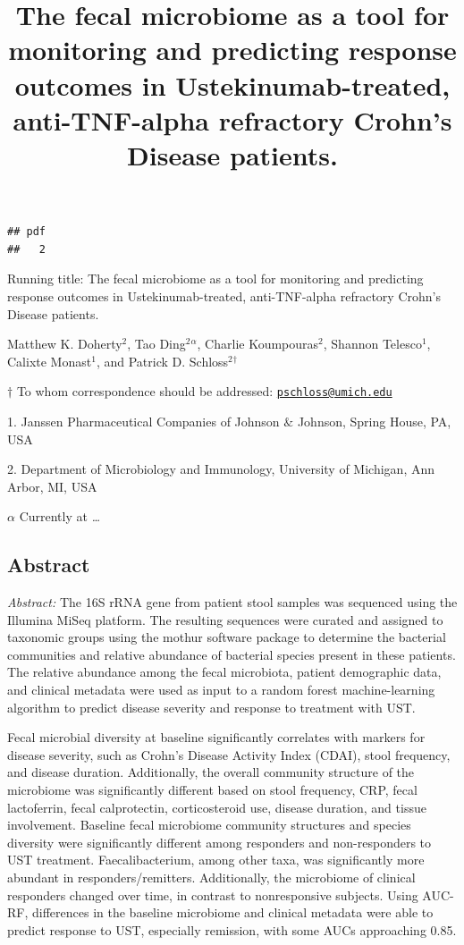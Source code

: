 \documentclass[11pt,]{article}
\title{The fecal microbiome as a tool for monitoring and predicting response
outcomes in Ustekinumab-treated, anti-TNF-alpha refractory Crohn's
Disease patients.}
\author{}
\date{}
\begin{document}
\maketitle

\begin{verbatim}
## pdf 
##   2
\end{verbatim}

\vspace{35mm}

Running title: The fecal microbiome as a tool for monitoring and
predicting response outcomes in Ustekinumab-treated, anti-TNF-alpha
refractory Crohn's Disease patients.

\vspace{35mm} Matthew K. Doherty\({^2}\), Tao Ding\({^2}\)\({^\alpha}\),
Charlie Koumpouras\({^2}\), Shannon Telesco\({^1}\), Calixte
Monast\({^1}\), and Patrick D. Schloss\({^2}\)\({^\dagger}\)

\(\dagger\) To whom correspondence should be addressed:
\href{mailto:pschloss@umich.edu}{\nolinkurl{pschloss@umich.edu}}

1. Janssen Pharmaceutical Companies of Johnson \({\&}\) Johnson, Spring
House, PA, USA

2. Department of Microbiology and Immunology, University of Michigan,
Ann Arbor, MI, USA

\({\alpha}\) Currently at \emph{\ldots{}}

\newpage

\subsection{Abstract}\label{abstract}

\emph{Abstract:} The 16S rRNA gene from patient stool samples was
sequenced using the Illumina MiSeq platform. The resulting sequences
were curated and assigned to taxonomic groups using the mothur software
package to determine the bacterial communities and relative abundance of
bacterial species present in these patients. The relative abundance
among the fecal microbiota, patient demographic data, and clinical
metadata were used as input to a random forest machine-learning
algorithm to predict disease severity and response to treatment with
UST.

Fecal microbial diversity at baseline significantly correlates with
markers for disease severity, such as Crohn's Disease Activity Index
(CDAI), stool frequency, and disease duration. Additionally, the overall
community structure of the microbiome was significantly different based
on stool frequency, CRP, fecal lactoferrin, fecal calprotectin,
corticosteroid use, disease duration, and tissue involvement. Baseline
fecal microbiome community structures and species diversity were
significantly different among responders and non-responders to UST
treatment. Faecalibacterium, among other taxa, was significantly more
abundant in responders/remitters. Additionally, the microbiome of
clinical responders changed over time, in contrast to nonresponsive
subjects. Using AUC-RF, differences in the baseline microbiome and
clinical metadata were able to predict response to UST, especially
remission, with some AUCs approaching 0.85.
\end{document}

